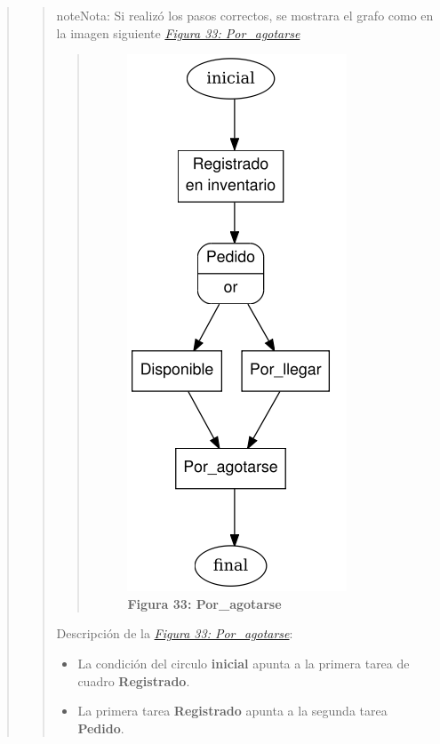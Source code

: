 \documentclass[letterpaper,11pt,spanish]{sphinxmanual}
\begin{document}
\begin{quote}
\begin{quote}
\begin{notice}{note}{Nota:}
Si realizó los pasos correctos, se mostrara el grafo como en la imagen siguiente {\hyperref[_templates/Contenido6/Parte4:figura33]{\emph{Figura 33: Por\_agotarse}}}
\begin{quote}
\begin{figure}[htbp]
\centering
\capstart

\includegraphics{grafo_inflow6.png}
\caption{\textbf{Figura 33: Por\_agotarse}}\label{_templates/Contenido6/Parte4:figura33}\end{figure}
\end{quote}

Descripción de la {\hyperref[_templates/Contenido6/Parte4:figura33]{\emph{Figura 33: Por\_agotarse}}}:
\begin{itemize}
\item {} 
La condición del circulo \textbf{inicial} apunta a la primera tarea de cuadro \textbf{Registrado}.

\item {} 
La primera tarea \textbf{Registrado} apunta a la segunda tarea \textbf{Pedido}.


\end{itemize}
\end{notice}
\end{quote}
\end{quote}
\end{document}

